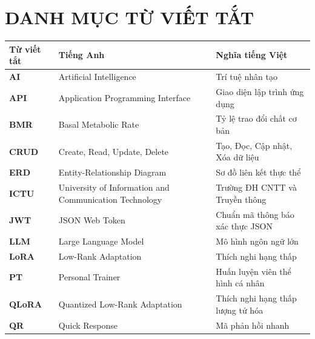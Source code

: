 
\chapter*{DANH MỤC TỪ VIẾT TẮT}


\begin{table}[htbp]
\centering
\begin{tabularx}{\textwidth}{l p{7.2cm} >{\raggedright\arraybackslash}X}
    \toprule
    \textbf{Từ viết tắt} & \textbf{Tiếng Anh} & \textbf{Nghĩa tiếng Việt} \\
    \midrule
    \textbf{AI}    & Artificial Intelligence              & Trí tuệ nhân tạo \\
    \textbf{API}   & Application Programming Interface    & Giao diện lập trình ứng dụng \\
    \textbf{BMR}   & Basal Metabolic Rate                 & Tỷ lệ trao đổi chất cơ bản \\
    \textbf{CRUD}  & Create, Read, Update, Delete         & Tạo, Đọc, Cập nhật, Xóa dữ liệu \\
    \textbf{ERD}   & Entity-Relationship Diagram          & Sơ đồ liên kết thực thể \\
    \textbf{ICTU}  & University of Information and Communication Technology & Trường ĐH CNTT và Truyền thông \\
    \textbf{JWT}   & JSON Web Token                       & Chuẩn mã thông báo xác thực JSON \\
    \textbf{LLM}   & Large Language Model                 & Mô hình ngôn ngữ lớn \\
    \textbf{LoRA}  & Low-Rank Adaptation                  & Thích nghi hạng thấp \\
    \textbf{PT}    & Personal Trainer                     & Huấn luyện viên thể hình cá nhân \\
    \textbf{QLoRA} & Quantized Low-Rank Adaptation        & Thích nghi hạng thấp lượng tử hóa \\
    \textbf{QR}    & Quick Response                       & Mã phản hồi nhanh \\

\end{tabularx}
\end{table}

